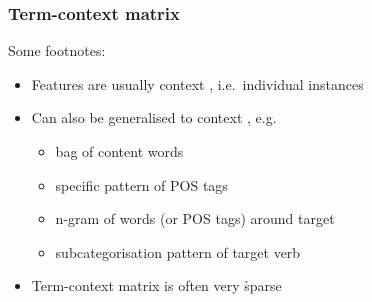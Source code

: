 \begin{frame}
  \frametitle{Term-context matrix}

  Some footnotes:
  \begin{itemize}
  \item Features are usually context , i.e.\ individual instances
  \item Can also be generalised to context , e.g.
    \begin{itemize}
    \item bag of content words
    \item specific pattern of POS tags 
    \item n-gram of words (or POS tags) around target
    \item subcategorisation pattern of target verb
    \end{itemize}
  \item Term-context matrix is often very \h{sparse}
  \end{itemize}

\end{frame}

